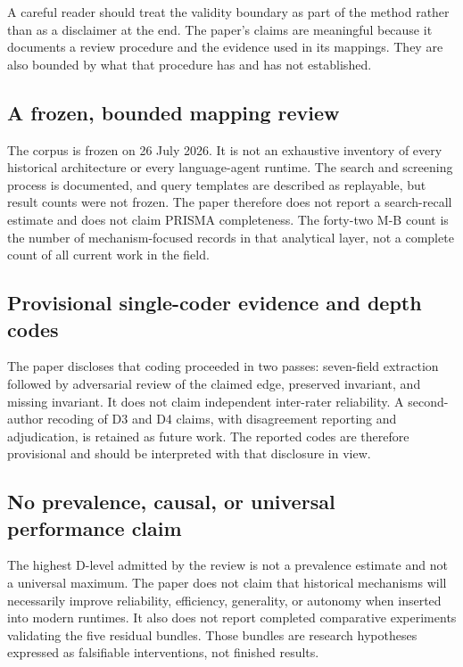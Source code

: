 A careful reader should treat the validity boundary as part of the method rather than as a disclaimer at the end. The paper's claims are meaningful because it documents a review procedure and the evidence used in its mappings. They are also bounded by what that procedure has and has not established.

\subsection{A frozen, bounded mapping review}

The corpus is frozen on 26 July 2026. It is not an exhaustive inventory of every historical architecture or every language-agent runtime. The search and screening process is documented, and query templates are described as replayable, but result counts were not frozen. The paper therefore does not report a search-recall estimate and does not claim PRISMA completeness. The forty-two M-B count is the number of mechanism-focused records in that analytical layer, not a complete count of all current work in the field.

\subsection{Provisional single-coder evidence and depth codes}

The paper discloses that coding proceeded in two passes: seven-field extraction followed by adversarial review of the claimed edge, preserved invariant, and missing invariant. It does not claim independent inter-rater reliability. A second-author recoding of D3 and D4 claims, with disagreement reporting and adjudication, is retained as future work. The reported codes are therefore provisional and should be interpreted with that disclosure in view.

\subsection{No prevalence, causal, or universal performance claim}

The highest D-level admitted by the review is not a prevalence estimate and not a universal maximum. The paper does not claim that historical mechanisms will necessarily improve reliability, efficiency, generality, or autonomy when inserted into modern runtimes. It also does not report completed comparative experiments validating the five residual bundles. Those bundles are research hypotheses expressed as falsifiable interventions, not finished results.

